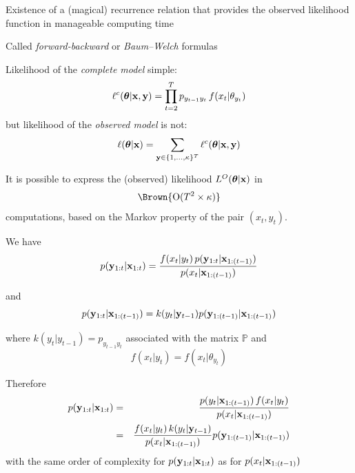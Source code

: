 \begin{slide}
Existence of a (magical) recurrence relation that provides the observed
likelihood function in manageable computing time

Called {\em forward-backward} or {\em Baum--Welch} formulas

\end{slide}\begin{slide}

Likelihood of the {\em complete model} simple:
$$
  \ell^c(\mbox{\boldmath{$\theta$}}|\mathbf{x},\mathbf{y}) = \prod_{t=2}^T p_{y_{t-1}y_t}\,f(x_t|\theta_{y_t})
$$
but likelihood of the {\em observed model} is not:
$$
\ell(\mbox{\boldmath{$\theta$}}|\mathbf{x}) = \sum_{\mathbf{y}\in\{1,\ldots,\kappa\}^T}  \ell^c(\mbox{\boldmath{$\theta$}}|\mathbf{x},\mathbf{y}) 
$$

\vs\pause
\centerline{}

\end{slide}\begin{slide}

It is possible to express the (observed) likelihood $L^O(\mbox{\boldmath{$\theta$}}|\mathbf{x})$ in 
$$
  \Brown{{\mathrm O}(T^2\times \kappa)}
$$
computations, based on the Markov property of the pair $(x_t,y_t)$.

\hyperlink{Basoo}{}

\end{slide}\begin{slide}

We have
$$
p(\mathbf{y}_{1:t}|\mathbf{x}_{1:t}) = \frac{f(x_t|y_t)\,p(\mathbf{y}_{1:t}|\mathbf{x}_{1:(t-1)})}{p(x_t|\mathbf{x}_{1:(t-1)})}
$$

and
$$
p(\mathbf{y}_{1:t}|\mathbf{x}_{1:(t-1)}) = k(y_t|\mathbf{y}_{t-1})p(\mathbf{y}_{1:(t-1)}|\mathbf{x}_{1:(t-1)})
$$

where $k(y_t|y_{t-1})=p_{y_{t-1}y_t}$ 
associated with the matrix ${\mathbb P}$ and
$$f(x_t|y_t) = f(x_t|\theta_{y_t})$$

\end{slide}\begin{slide}

Therefore
\begin{eqnarray*}
p(\mathbf{y}_{1:t}|\mathbf{x}_{1:t}) &=& \frac{p(y_t|\mathbf{x}_{1:(t-1)})\,f(x_t|y_t)}{p(x_t|\mathbf{x}_{1:(t-1)})}
\nonumber\\
&=& \frac{f(x_t|y_t)\,k(y_t|\mathbf{y}_{t-1})}{p(x_t|\mathbf{x}_{1:(t-1)})}
p(\mathbf{y}_{1:(t-1)}|\mathbf{x}_{1:(t-1)})
\end{eqnarray*}
with the same order of complexity for $p(\mathbf{y}_{1:t}|\mathbf{x}_{1:t})$ 
as for $p(x_t|\mathbf{x}_{1:(t-1)})$


\end{slide}
